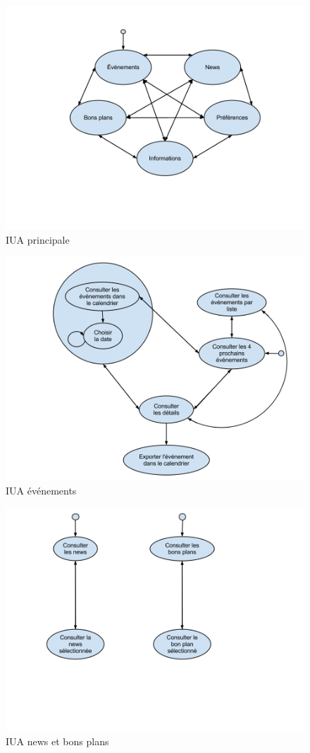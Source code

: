 \documentclass[a4paper, 11pt]{article}
\begin{document}
\begin{figure}[htbp]
\centering
	\caption{IUA principale}
\includegraphics[width = 13cm]{IUAprincipale.png}
\end{figure}
\begin{figure}[h!]
\centering
\includegraphics[width = 12cm]{IUAevenements.png}
	\caption{IUA événements}
\end{figure}
\vfill
\clearpage


\begin{figure}[h!]
\centering
	\caption{IUA news et bons plans}
\includegraphics[width = 13cm]{IUAnewsbonsplans.png}
\end{figure}
\end{document}
